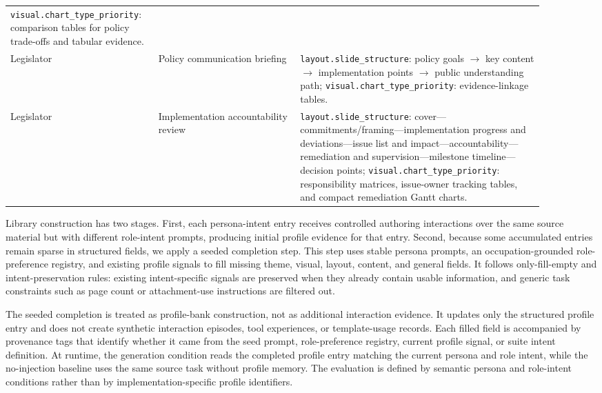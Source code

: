 \documentclass{llmxive}
\begin{document}
\begin{longtable}{>{\scriptsize\arraybackslash}p{0.22\linewidth}
                  >{\scriptsize\arraybackslash}p{0.25\linewidth}
                  >{\scriptsize\arraybackslash}p{0.43\linewidth}}
\texttt{visual.chart\_type\_priority}: comparison tables for policy trade-offs
and tabular evidence. \\
Legislator & Policy communication briefing &
\texttt{layout.slide\_structure}: policy goals $\rightarrow$ key content
$\rightarrow$ implementation points $\rightarrow$ public understanding path;
\texttt{visual.chart\_type\_priority}: evidence-linkage tables. \\
Legislator & Implementation accountability review &
\texttt{layout.slide\_structure}: cover---commitments/framing---implementation
progress and deviations---issue list and impact---accountability---remediation
and supervision---milestone timeline---decision points;
\texttt{visual.chart\_type\_priority}: responsibility matrices, issue-owner
tracking tables, and compact remediation Gantt charts. \\
\end{longtable}
\endgroup


Library construction has two stages. First, each persona-intent entry receives
controlled authoring interactions over the same source material but with
different role-intent prompts, producing initial profile evidence for that
entry. Second, because some accumulated entries remain sparse in structured
fields, we apply a seeded completion step. This step uses stable persona
prompts, an occupation-grounded role-preference registry, and existing profile
signals to fill missing theme, visual, layout, content, and general fields. It
follows only-fill-empty and intent-preservation rules: existing intent-specific
signals are preserved when they already contain usable information, and generic
task constraints such as page count or attachment-use instructions are filtered
out.

The seeded completion is treated as profile-bank construction, not as
additional interaction evidence. It updates only the structured profile entry
and does not create synthetic interaction episodes, tool experiences, or
template-usage records. Each filled field is accompanied by provenance tags
that identify whether it came from the seed prompt, role-preference registry,
current profile signal, or suite intent definition. At runtime, the generation
condition reads the completed profile entry matching the current persona and
role intent, while the no-injection baseline uses the same source task without
profile memory. The evaluation is defined by semantic persona and role-intent
conditions rather than by implementation-specific profile identifiers.
\end{document}

